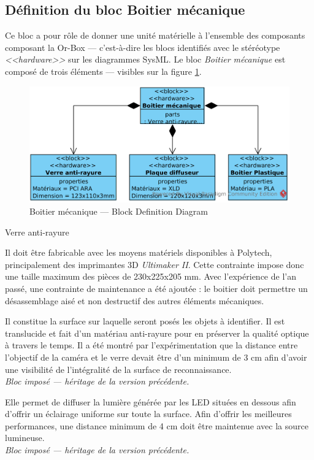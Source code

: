
    \subsection{Définition du bloc Boitier mécanique}
\label{sub:DefMeca}

Ce bloc a pour rôle de donner une unité matérielle à l'ensemble des composants composant la Or-Box --- c'est-à-dire les blocs identifiés avec le stéréotype \emph{<<hardware>>} sur les diagrammes SysML.
Le bloc \emph{Boitier mécanique} est composé de trois éléments --- visibles sur la figure \ref{MecaBDD}.


\begin{figure}[H]
	\centerline{
		\includegraphics[scale=0.75]{img/SysML_Meca_BDD.png}
	}
	\caption{Boitier mécanique --- Block Definition Diagram}
	\label{MecaBDD}
\end{figure}

\begin{labeling}[~--]{Verre anti-rayure}
	\item [Boitier plastique]
	Il doit être fabricable avec les moyens matériels disponibles à Polytech, principalement des imprimantes 3D \emph{Ultimaker II}.
	Cette contrainte impose donc une taille maximum des pièces de 230x225x205 mm.
	Avec l'expérience de l'an passé, une contrainte de maintenance a été ajoutée : le boitier doit permettre un désassemblage aisé et non destructif des autres éléments mécaniques. 	
	\item [Verre anti-rayure]
	Il constitue la surface sur laquelle seront posés les objets à identifier.
	Il est translucide et fait d'un matériau anti-rayure pour en préserver la qualité optique à travers le temps.
	Il a été montré par l'expérimentation que la distance entre l'objectif de la caméra et le verre devait être d'un minimum de 3 cm afin d'avoir une visibilité de l'intégralité de la surface de reconnaissance.
	\\ \emph{Bloc imposé --- héritage de la version précédente.}
	\item [Plaque diffuseur]
	Elle permet de diffuser la lumière générée par les LED situées en dessous afin d'offrir un éclairage uniforme sur toute la surface.
	Afin d'offrir les meilleures performances, une distance minimum de 4 cm doit être maintenue avec la source lumineuse.
	\\ \emph{Bloc imposé --- héritage de la version précédente.}	
	
\end{labeling}

